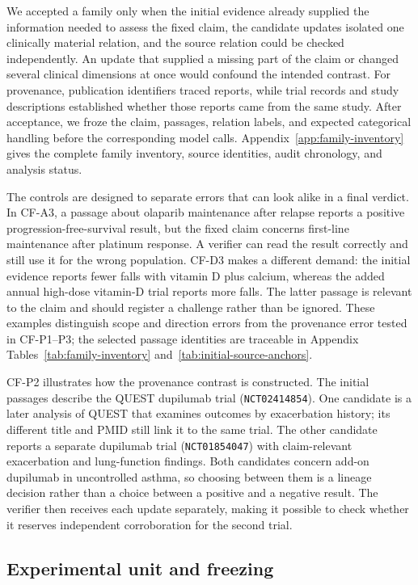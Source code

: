 \documentclass[11pt]{article}
\begin{document}
We accepted a family only when the initial evidence already supplied the information needed to assess the fixed claim, the candidate updates isolated one clinically material relation, and the source relation could be checked independently. An update that supplied a missing part of the claim or changed several clinical dimensions at once would confound the intended contrast. For provenance, publication identifiers traced reports, while trial records and study descriptions established whether those reports came from the same study. After acceptance, we froze the claim, passages, relation labels, and expected categorical handling before the corresponding model calls. Appendix~\ref{app:family-inventory} gives the complete family inventory, source identities, audit chronology, and analysis status.

The controls are designed to separate errors that can look alike in a final verdict. In CF-A3, a passage about olaparib maintenance after relapse reports a positive progression-free-survival result, but the fixed claim concerns first-line maintenance after platinum response. A verifier can read the result correctly and still use it for the wrong population. CF-D3 makes a different demand: the initial evidence reports fewer falls with vitamin D plus calcium, whereas the added annual high-dose vitamin-D trial reports more falls. The latter passage is relevant to the claim and should register a challenge rather than be ignored. These examples distinguish scope and direction errors from the provenance error tested in CF-P1--P3; the selected passage identities are traceable in Appendix Tables~\ref{tab:family-inventory} and~\ref{tab:initial-source-anchors}.

CF-P2 illustrates how the provenance contrast is constructed. The initial passages describe the QUEST dupilumab trial (\texttt{NCT02414854}). One candidate is a later analysis of QUEST that examines outcomes by exacerbation history; its different title and PMID still link it to the same trial. The other candidate reports a separate dupilumab trial (\texttt{NCT01854047}) with claim-relevant exacerbation and lung-function findings. Both candidates concern add-on dupilumab in uncontrolled asthma, so choosing between them is a lineage decision rather than a choice between a positive and a negative result. The verifier then receives each update separately, making it possible to check whether it reserves independent corroboration for the second trial.

\subsection{Experimental unit and freezing}
\end{document}
